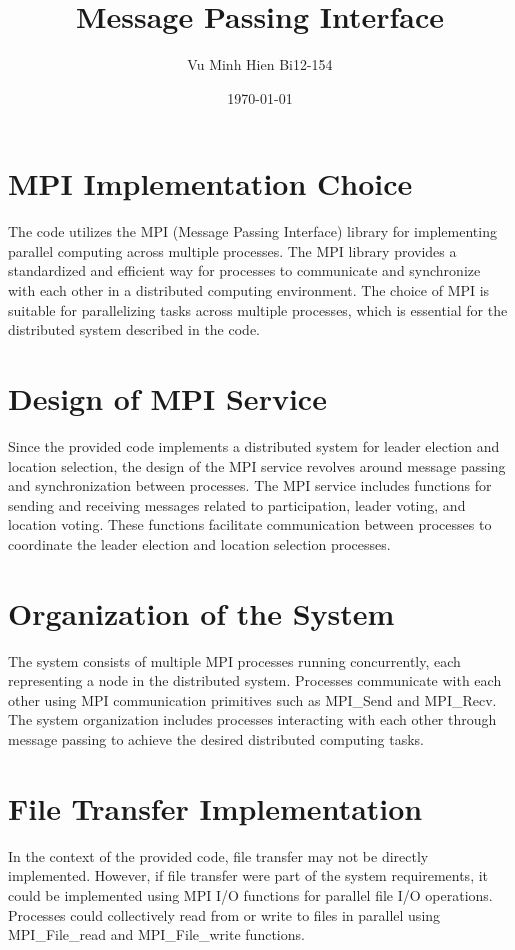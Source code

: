 \documentclass{article}
\begin{document}
\title{Message Passing Interface}
\author{Vu Minh Hien Bi12-154}
\date{\today}

\maketitle
\section{MPI Implementation Choice}
The code utilizes the MPI (Message Passing Interface) library for implementing parallel computing across multiple processes. The MPI library provides a standardized and efficient way for processes to communicate and synchronize with each other in a distributed computing environment. The choice of MPI is suitable for parallelizing tasks across multiple processes, which is essential for the distributed system described in the code.

\section{Design of MPI Service}
Since the provided code implements a distributed system for leader election and location selection, the design of the MPI service revolves around message passing and synchronization between processes. The MPI service includes functions for sending and receiving messages related to participation, leader voting, and location voting. These functions facilitate communication between processes to coordinate the leader election and location selection processes.

\section{Organization of the System}
The system consists of multiple MPI processes running concurrently, each representing a node in the distributed system. Processes communicate with each other using MPI communication primitives such as MPI\_Send and MPI\_Recv. The system organization includes processes interacting with each other through message passing to achieve the desired distributed computing tasks.

\section{File Transfer Implementation}
In the context of the provided code, file transfer may not be directly implemented. However, if file transfer were part of the system requirements, it could be implemented using MPI I/O functions for parallel file I/O operations. Processes could collectively read from or write to files in parallel using MPI\_File\_read and MPI\_File\_write functions.
\end{document}
